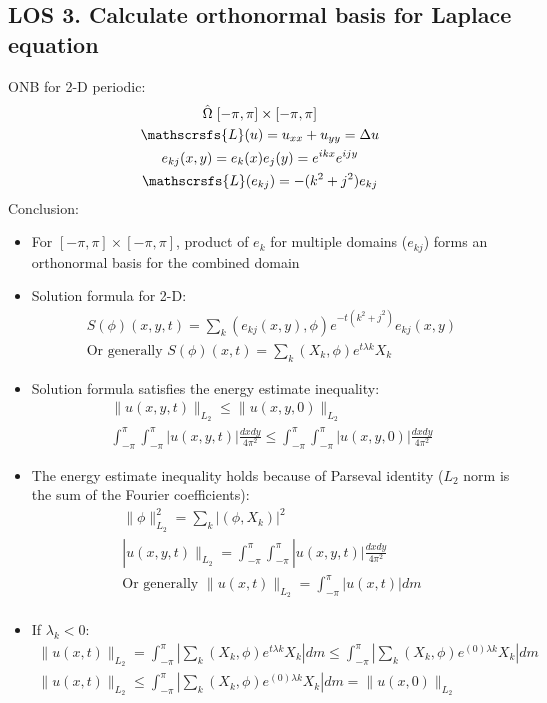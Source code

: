 \documentclass[12pt, a4paper]{article}
\begin{document}
\subsection*{LOS 3. Calculate orthonormal basis for Laplace equation}
ONB for 2-D periodic:
\begin{gather*}
    \hat{\Omega} \; [-\pi, \pi] \times [-\pi, \pi]\\
    \mathscrsfs{L}(u) = u_{xx} + u_{yy} = \Delta u \\
    e_{kj} (x, y) = e_k(x)e_j(y) = e^{ikx}e^{ijy} \\
    \mathscrsfs{L}(e_{kj}) = -(k^2+j^2)e_{kj} \\
\end{gather*}
Conclusion:
\begin{itemize}
    \item For $[-\pi, \pi] \times [-\pi, \pi]$, product of $e_k$ for multiple domains ($e_{kj}$) forms an orthonormal basis for the combined domain
    \item Solution formula for 2-D: 
    \begin{gather*}
        S(\phi)(x, y, t) = \sum_k(e_{kj}(x, y), \phi)e^{-t(k^2+j^2)}e_{kj}(x, y)\\
        \text{Or generally } S(\phi)(x, t) = \sum_{k} (X_k, \phi)e^{t\lambda k}X_k
    \end{gather*}
    \item Solution formula satisfies the energy estimate inequality:
    \begin{gather*}
        \|u(x, y, t)\|_{L_2} \leq \|u(x, y, 0)\|_{L_2}\\
        \int_{-\pi}^\pi\int_{-\pi}^\pi |u(x, y, t)|\frac{dxdy}{4\pi^2} \leq \int_{-\pi}^\pi\int_{-\pi}^\pi |u(x, y, 0)|\frac{dxdy}{4\pi^2} 
    \end{gather*}
    \item The energy estimate inequality holds because of Parseval identity ($L_2$ norm is the sum of the Fourier coefficients):
    \begin{gather*}
        \|\phi\|^2_{L_2} = \sum_k|(\phi, X_k)|^2\\
        |u(x, y, t)\|_{L_2} = \int_{-\pi}^\pi\int_{-\pi}^\pi |u(x, y, t)|\frac{dxdy}{4\pi^2} \\
        \text{Or generally } \|u(x, t)\|_{L_2} = \int_{-\pi}^\pi |u(x, t)|dm \\
    \end{gather*}
    \item If $\lambda_k < 0$:
    \begin{gather*}
        \|u(x, t)\|_{L_2}= \int_{-\pi}^\pi \left|\sum_{k} (X_k, \phi)e^{t\lambda k}X_k\right|dm \leq \int_{-\pi}^\pi \left|\sum_{k} (X_k, \phi)e^{(0)\lambda k}X_k\right|dm\\
        \|u(x, t)\|_{L_2} \leq \int_{-\pi}^\pi \left|\sum_{k} (X_k, \phi)e^{(0)\lambda k}X_k\right|dm = \|u(x, 0)\|_{L_2}\\
    \end{gather*}    
\end{itemize}
\end{document}
